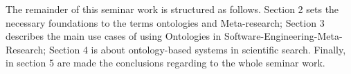 The remainder of this seminar work is structured as follows. Section 2 sets the necessary foundations to the terms ontologies and Meta-research; Section 3 describes the main use cases of using Ontologies in Software-Engineering-Meta-Research; Section 4 is about ontology-based systems in scientific search. Finally, in section 5 are made the conclusions regarding to the whole seminar work.               